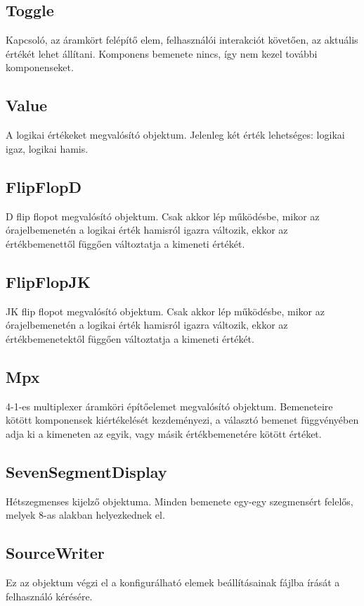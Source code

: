 \subsection{\bf Toggle}
Kapcsoló, az áramkört felépítő elem, felhasználói interakciót követően, az aktuális értékét lehet állítani. Komponens bemenete nincs, így nem kezel további komponenseket.

\subsection{\bf Value}
A logikai értékeket megvalósító objektum. Jelenleg két érték lehetséges: logikai igaz, logikai hamis.

\subsection{\bf FlipFlopD}
D flip flopot megvalósító objektum. Csak akkor lép működésbe, mikor az órajelbemenetén a logikai érték hamisról igazra változik, ekkor az értékbemenettől függően változtatja a kimeneti értékét.

\subsection{\bf FlipFlopJK}
JK flip flopot megvalósító objektum. Csak akkor lép működésbe, mikor az órajelbemenetén a logikai érték hamisról igazra változik, ekkor az értékbemenetektől függően változtatja a kimeneti értékét.

\subsection{\bf Mpx}
4-1-es multiplexer áramköri építőelemet megvalósító objektum. Bemeneteire kötött komponensek kiértékelését kezdeményezi, a választó bemenet függvényében adja ki a kimeneten az egyik, vagy másik értékbemenetére kötött értéket.

\subsection{\bf SevenSegmentDisplay}
Hétszegmenses kijelző objektuma. Minden bemenete egy-egy szegmensért felelős, melyek 8-as alakban helyezkednek el.

\subsection{\bf SourceWriter}
Ez az objektum végzi el a konfigurálható elemek beállításainak fájlba írását a felhasználó kérésére.

